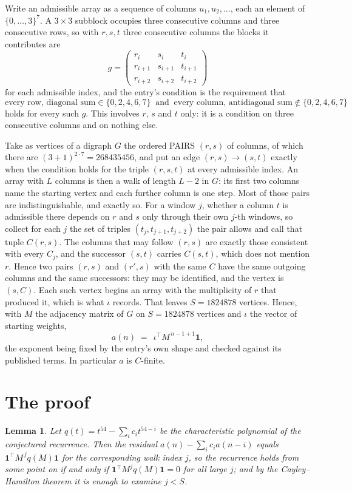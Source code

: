 \documentclass[11pt,a4paper]{article}
\theoremstyle{plain}
\newtheorem{lemma}[theorem]{Lemma}
\theoremstyle{definition}
\begin{document}
Write an admissible array as a sequence of columns $u_1,u_2,\dots$, each an element of
$\{0,\dots,3\}^{7}$. A $3\times3$ subblock occupies three consecutive columns and
three consecutive rows, so with $r,s,t$ three consecutive columns the blocks it
contributes are
\[
g=\begin{pmatrix}r_i&s_i&t_i\\ r_{i+1}&s_{i+1}&t_{i+1}\\ r_{i+2}&s_{i+2}&t_{i+2}\end{pmatrix}
\]
for each admissible index, and the entry's condition is the requirement that
\[
\text{every row, diagonal sum} \in \{0,2,4,6,7\}\ \text{ and }\ \text{every column, antidiagonal sum} \notin \{0,2,4,6,7\}
\]
holds for every such $g$. This involves $r$, $s$ and $t$ only: it is a condition on
three consecutive columns and on nothing else.

Take as vertices of a digraph $G$ the ordered PAIRS $(r,s)$ of columns, of which there are
$(3+1)^{2\cdot7}=268435456$, and put an edge $(r,s)\to(s,t)$ exactly when the condition
holds for the triple $(r,s,t)$ at every admissible index. An array with $L$ columns is then a
walk of length $L-2$ in $G$: its first two columns name the starting vertex and each further
column is one step. Most of those pairs are indistinguishable, and exactly so. For a window $j$, whether a column $t$ is admissible there depends on $r$ and $s$ only through their own $j$-th windows, so collect for each $j$ the set of triples $(t_j,t_{j+1},t_{j+2})$ the pair allows and call that tuple $C(r,s)$. The columns that may follow $(r,s)$ are exactly those consistent with every $C_j$, and the successor $(s,t)$ carries $C(s,t)$, which does not mention $r$. Hence two pairs $(r,s)$ and $(r',s)$ with the same $C$ have the same outgoing columns and the same successors: they may be identified, and the vertex is $(s,C)$. Each such vertex begins an array with the multiplicity of $r$ that produced it, which is what $\iota$ records. That leaves $S=1824878$ vertices. Hence, with $M$ the adjacency matrix of $G$ on $S=1824878$ vertices and
$\iota$ the vector of starting weights,
\[
a(n)\;=\;\,\iota^{\!\top}M^{\,n-1+1}\mathbf{1},
\]
the exponent being fixed by the entry's own shape and checked against its published terms.
In particular $a$ is $C$-finite.

\section{The proof}

\begin{lemma}\label{lem:crit}
Let $q(t)=t^{54}-\sum_i c_it^{54-i}$ be the characteristic polynomial of the
conjectured recurrence. Then the residual $a(n)-\sum_ic_ia(n-i)$ equals
$\mathbf{1}^{\!\top}M^{\,j}q(M)\mathbf{1}$ for the corresponding walk index
$j$, so the recurrence holds from some point on if and only if
$\mathbf{1}^{\!\top}M^{j}q(M)\mathbf{1}=0$ for all large $j$; and by the
Cayley--Hamilton theorem it is enough to examine $j<S$.
\end{lemma}
\end{document}
